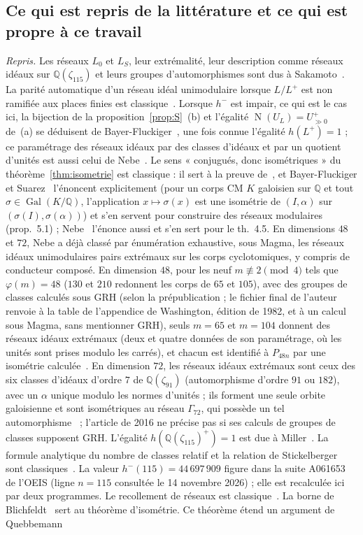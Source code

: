 \documentclass[11pt,a4paper]{amsart}
\theoremstyle{plain}
\theoremstyle{definition}
\numberwithin{equation}{section}
\newcommand{\Q}{\mathbb{Q}}
\DeclareMathOperator{\Nm}{N}
\DeclareMathOperator{\Gal}{Gal}
\newcommand{\Upp}{U^{+}_{\gg0}}
\newcommand{\Lz}{L_{0}}
\newcommand{\LS}{L_{S}}
\begin{document}
\subsection{Ce qui est repris de la littérature et ce qui est propre à ce travail}\label{subsec:connu}
\emph{Repris.} Les réseaux $\Lz$ et $\LS$, leur extrémalité, leur description comme réseaux idéaux sur $\Q(\zeta_{115})$ et leurs groupes d'automorphismes sont dus à Sakamoto~\cite{Sak26}. La parité automatique d'un réseau idéal unimodulaire lorsque $L/L^+$ est non ramifiée aux places finies est classique~\cite{Bay84,Bay99}. Lorsque $h^-$ est impair, ce qui est le cas ici, la bijection de la proposition~\ref{prop:S}~(b) et l'égalité $\Nm(U_L)=\Upp$ de~(a) se déduisent de Bayer-Fluckiger~\cite[prop.~3.1 et lemme~3.2~a)]{Bay84}, une fois connue l'égalité $h(L^+)=1$ ; ce paramétrage des réseaux idéaux par des classes d'idéaux et par un quotient d'unités est aussi celui de Nebe~\cite[rem.~4.4]{Neb16}. Le sens « conjugués, donc isométriques » du théorème~\ref{thm:isometrie} est classique : il sert à la preuve de~\cite[cor.~3.3]{Bay84}, et Bayer-Fluckiger et Suarez~\cite[\S5, p.~409]{BFS05} l'énoncent explicitement (pour un corps CM $K$ galoisien sur $\Q$ et tout $\sigma\in\Gal(K/\Q)$, l'application $x\mapsto\sigma(x)$ est une isométrie de $(I,\alpha)$ sur $(\sigma(I),\sigma(\alpha))$) et s'en servent pour construire des réseaux modulaires (prop.~5.1) ; Nebe~\cite[lemme~4.3~b)]{Neb16} l'énonce aussi et s'en sert pour le th.~4.5. En dimensions $48$ et $72$, Nebe a déjà classé par énumération exhaustive, sous Magma, les réseaux idéaux unimodulaires pairs extrémaux sur les corps cyclotomiques, y compris de conducteur composé. En dimension $48$, pour les neuf $m\not\equiv2\pmod4$ tels que $\varphi(m)=48$ ($130$ et $210$ redonnent les corps de $65$ et $105$), avec des groupes de classes calculés sous GRH (selon la prépublication ; le fichier final de l'auteur renvoie à la table de l'appendice de Washington, édition de 1982, et à un calcul sous Magma, sans mentionner GRH), seuls $m=65$ et $m=104$ donnent des réseaux idéaux extrémaux (deux et quatre données de son paramétrage, où les unités sont prises modulo les carrés), et chacun est identifié à $P_{48n}$ par une isométrie calculée~\cite[th.~5.3 et sa preuve]{Neb13}. En dimension $72$, les réseaux idéaux extrémaux sont ceux des six classes d'idéaux d'ordre $7$ de $\Q(\zeta_{91})$ (automorphisme d'ordre $91$ ou $182$), avec un $\alpha$ unique modulo les normes d'unités ; ils forment une seule orbite galoisienne et sont isométriques au réseau $\Gamma_{72}$, qui possède un tel automorphisme~\cite[th.~4.5 et sa preuve]{Neb16} ; l'article de 2016 ne précise pas si ses calculs de groupes de classes supposent GRH. L'égalité $h(\Q(\zeta_{115})^+)=1$ est due à Miller~\cite{Mil14}. La formule analytique du nombre de classes relatif et la relation de Stickelberger sont classiques~\cite{Was97}. La valeur $h^-(115)=44\,697\,909$ figure dans la suite A061653 de l'OEIS (ligne $n=115$ consultée le 14 novembre 2026) ; elle est recalculée ici par deux programmes. Le recollement de réseaux est classique~\cite[ch.~4]{SPLAG}. La borne de Blichfeldt~\cite{Bli29} sert au théorème d'isométrie. Ce théorème étend un argument de Quebbemann~\cite[\S3]{Que81} 
\end{document}
